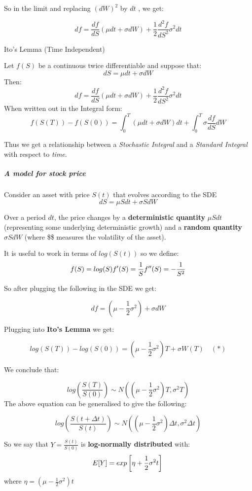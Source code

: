 So in the limit and replacing $(dW)^2$ by $dt$ , we get:

\[df = \frac{df}{dS}(\mu dt+\sigma dW) + \frac{1}{2}\frac{d^2f}{dS^2}\sigma^2dt\]

Ito's Lemma (Time Independent)

Let $f(S)$ be a continuous twice differentiable and suppose that:
\[ dS = \mu dt + \sigma dW\] Then:
\[df = \frac{df}{dS}(\mu dt+\sigma dW) + \frac{1}{2}\frac{d^2f}{dS^2}\sigma^2dt\]
When written out in the Integral form:
\[ f(S(T)) - f(S(0)) = \int_{0}^{T} \left(\mu dt+\sigma dW\right) dt + \int_{0}^{T} \sigma\frac{df}{dS} dW\]

Thus we get a relationship between a \emph{Stochastic Integral} and a
\emph{Standard Integral} with respect to \emph{time}.

\subparagraph{A model for stock price}\label{a-model-for-stock-price}

Consider an asset with price $S(t)$ that evolves according to the SDE
\[ dS = \mu Sdt + \sigma SdW\]

Over a period $dt$, the price changes by a \textbf{deterministic
quantity} $\mu Sdt$ (representing some underlying deterministic growth)
and a \textbf{random quantity} $\sigma SdW$ (where \$\sigma\$ measures
the volatility of the asset).

It is useful to work in terms of $log(S(t))$ so we define:
\[ f(S) = log(S) \\ f'(S) = \frac{1}{S} \\ f''(S) = -\frac{1}{S^2} \]

So after plugging the following in the SDE we get:

\[ df = \left(\mu - \frac{1}{2}\sigma^2\right) + \sigma dW \]

Plugging into \textbf{Ito's Lemma} we get:

\[ log(S(T)) - log(S(0)) = \left(\mu - \frac{1}{2}\sigma^2\right)T + \sigma W(T) \quad (*)\]

We conclude that:

\[ log\left(\frac{S(T)}{S(0)}\right) \sim N\left((\mu - \frac{1}{2}\sigma^2)T,\sigma^2T\right) \]
The above equation can be generalised to give the following:

\[ log\left(\frac{S(t+\Delta t)}{S(t)}\right) \sim N\left((\mu - \frac{1}{2}\sigma^2)\Delta t,\sigma^2\Delta t\right)\]

So we say that $Y = \frac{S(t)}{S(0)}$ is \textbf{log-normally
distributed} with:
\[ E[Y] = exp\left[{\eta+\frac{1}{2}\sigma^2}t\right] \\ \] where
$\eta = (\mu - \frac{1}{2}\sigma^2)t$

